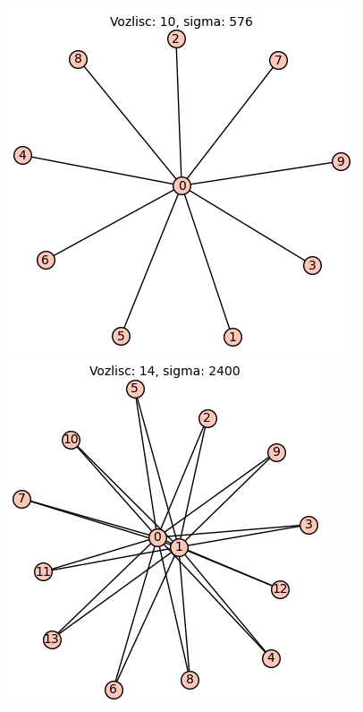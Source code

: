 \documentclass[a4paper,12pt]{article}
\begin{document}
\begin{figure}[h]
      \centering
      \begin{minipage}[b]{0.32\textwidth}
          \centering
          \includegraphics[width=\textwidth]{graf_eno_centralno.png}
      \end{minipage}
      \hfill
      \begin{minipage}[b]{0.32\textwidth}
          \centering
          \includegraphics[width=\textwidth]{graf_dve_centralni.png}

\end{minipage}
\end{figure}
\end{document}
